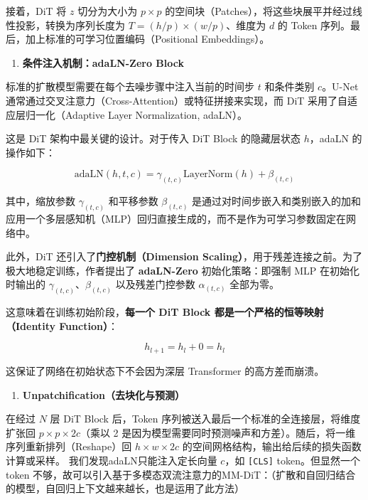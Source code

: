 接着，DiT 将 \(z\) 切分为大小为 \(p\times p\) 的空间块（Patches），将这些块展平并经过线性投影，转换为序列长度为 \(T=(h/p)\times(w/p)\)、维度为 \(d\) 的 Token 序列。最后，加上标准的可学习位置编码（Positional Embeddings）。

\begin{enumerate}
\def\labelenumi{\arabic{enumi}.}
\setcounter{enumi}{1}
\tightlist
\item
  \textbf{条件注入机制：adaLN-Zero Block}
\end{enumerate}

标准的扩散模型需要在每个去噪步骤中注入当前的时间步 \(t\) 和条件类别 \(c\)。U-Net 通常通过交叉注意力（Cross-Attention）或特征拼接来实现，而 DiT 采用了自适应层归一化（Adaptive Layer Normalization, adaLN）。

这是 DiT 架构中最关键的设计。对于传入 DiT Block 的隐藏层状态 \(h\)，adaLN 的操作如下：

\[
\mathrm{adaLN}(h,t,c)=\gamma_{(t,c)}\mathrm{LayerNorm}(h)+\beta_{(t,c)}
\]

其中，缩放参数 \(\gamma_{(t,c)}\) 和平移参数 \(\beta_{(t,c)}\) 是通过对时间步嵌入和类别嵌入的加和应用一个多层感知机（MLP）回归直接生成的，而不是作为可学习参数固定在网络中。

此外，DiT 还引入了\textbf{门控机制（Dimension Scaling）}，用于残差连接之前。为了极大地稳定训练，作者提出了 \textbf{adaLN-Zero} 初始化策略：即强制 MLP 在初始化时输出的 \(\gamma_{(t,c)}\)、\(\beta_{(t,c)}\) 以及残差门控参数 \(\alpha_{(t,c)}\) 全部为零。

这意味着在训练初始阶段，\textbf{每一个 DiT Block 都是一个严格的恒等映射（Identity Function）}：

\[
h_{l+1}=h_l+0=h_l
\]

这保证了网络在初始状态下不会因为深层 Transformer 的高方差而崩溃。

\begin{enumerate}
\def\labelenumi{\arabic{enumi}.}
\setcounter{enumi}{2}
\tightlist
\item
  \textbf{Unpatchification（去块化与预测）}
\end{enumerate}

在经过 \(N\) 层 DiT Block 后，Token 序列被送入最后一个标准的全连接层，将维度扩张回 \(p\times p\times 2c\)（乘以 2 是因为模型需要同时预测噪声和方差）。随后，将一维序列重新排列（Reshape）回 \(h\times w\times 2c\) 的空间网格结构，输出给后续的损失函数计算或采样。
我们发现adaLN只能注入定长向量 \(c\)，如 \texttt{{[}CLS{]}} token。但显然一个 token 不够，故可以引入基于多模态双流注意力的MM-DiT：（扩散和自回归结合的模型，自回归上下文越来越长，也是运用了此方法）

